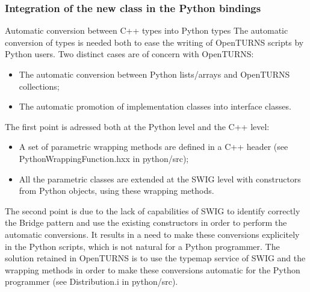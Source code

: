 \documentclass[8pt]{beamer}
\begin{document}
\begin{frame}
  \frametitle{Integration of the new class in the Python bindings}
  \begin{block}{Automatic conversion between C++ types into Python types}
    The automatic conversion of types is needed both to ease the writing of OpenTURNS scripts by Python users. Two distinct cases are of concern with OpenTURNS:
    \begin{itemize}
    \item The automatic conversion between Python lists/arrays and OpenTURNS collections;
    \item The automatic promotion of implementation classes into interface classes.
    \end{itemize}
    The first point is adressed both at the Python level and the C++ level:
    \begin{itemize}
    \item A set of parametric wrapping methods are defined in a C++ header (see PythonWrappingFunction.hxx in python/src);
    \item All the parametric classes are extended at the SWIG level with constructors from Python objects, using these wrapping methods.
    \end{itemize}
    The second point is due to the lack of capabilities of SWIG to identify correctly the Bridge pattern and use the existing constructors in order to perform the automatic conversions. It results in a need to make these conversions explicitely in the Python scripts, which is not natural for a Python programmer. The solution retained in OpenTURNS is to use the {\ttfamily typemap} service of SWIG and the wrapping methods in order to make these conversions automatic for the Python programmer (see Distribution.i in python/src).
  \end{block}
\end{frame}
\end{document}
